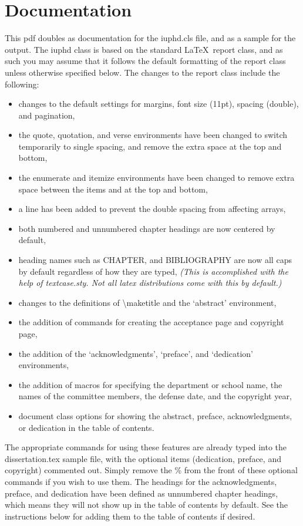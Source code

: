 \chapter{Documentation}

This pdf doubles as documentation for the iuphd.cls file, and as a sample for the output.
The iuphd class is based on the standard \LaTeX \ report class, and as such you may assume that it follows
the default formatting of the report class unless otherwise specified below.  The
changes to the report class include the following:

\begin{itemize}
 \item changes to the default settings for margins, font size (11pt), spacing (double), and pagination,
 \item the quote, quotation, and verse environments have been changed to switch temporarily to single spacing, and
       remove the extra space at the top and bottom,
 \item the enumerate and itemize environments have been changed to remove extra space between the items and at the
       top and bottom,
 \item a line has been added to prevent the double spacing from affecting arrays,
 \item both numbered and unnumbered chapter headings are now centered by default,
 \item heading names such as CHAPTER, and BIBLIOGRAPHY are now all caps by default regardless of how they are typed,
 \emph{(This is accomplished with the help of textcase.sty.  Not all latex distributions come with this by default.)}
 \item changes to the definitions of \textbackslash maketitle and the `abstract' environment,
 \item the addition of commands for creating the acceptance page and copyright page,
 \item the addition of the `acknowledgments', `preface', and `dedication' environments,
 \item the addition of macros for specifying the department or school name, the names of
 the committee members, the defense date, and the copyright year,
 \item document class options for showing
 the abstract, preface, acknowledgments, or dedication in the table of contents.
\end{itemize}

The appropriate commands for using these features are already typed into the dissertation.tex sample file,
with the optional items (dedication, preface, and copyright) commented out.  Simply remove the \% from the front
of these optional commands if you wish to use them.  The headings for the acknowledgments, preface, and dedication have
been defined as unnumbered chapter headings, which means they will not show up in the table of contents by default.
See the instructions below for adding them to the table of contents if desired.

